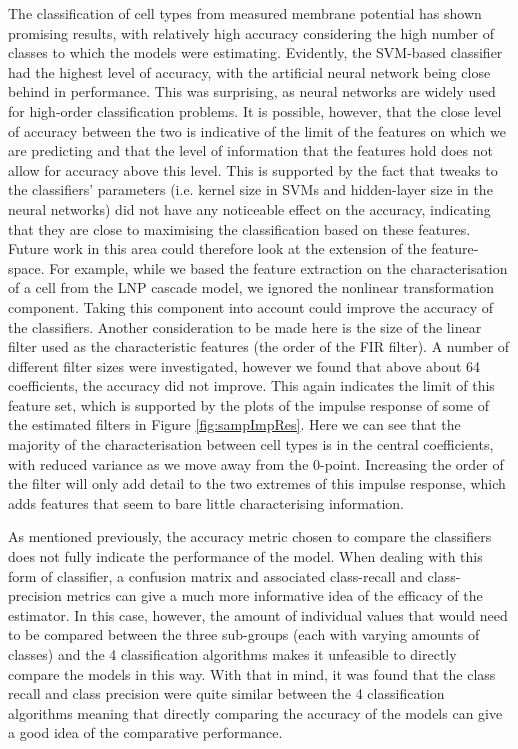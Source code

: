 The classification of cell types from measured membrane potential has shown promising results, with relatively high accuracy considering the high number of classes to which the models were estimating. Evidently, the SVM-based classifier had the highest level of accuracy, with the artificial neural network being close behind in performance. This was surprising, as neural networks are widely used for high-order classification problems. It is possible, however, that the close level of accuracy between the two is indicative of the limit of the features on which we are predicting and that the level of information that the features hold does not allow for accuracy above this level. This is supported by the fact that tweaks to the classifiers' parameters (i.e. kernel size in SVMs and hidden-layer size in the neural networks) did not have any noticeable effect on the accuracy, indicating that they are close to maximising the classification based on these features. Future work in this area could therefore look at the extension of the feature-space. For example, while we based the feature extraction on the characterisation of a cell from the LNP cascade model, we ignored the nonlinear transformation component. Taking this component into account could improve the accuracy of the classifiers. Another consideration to be made here is the size of the linear filter used as the characteristic features (the order of the FIR filter). A number of different filter sizes were investigated, however we found that above about 64 coefficients, the accuracy did not improve. This again indicates the limit of this feature set, which is supported by the plots of the impulse response of some of the estimated filters in Figure \ref{fig:sampImpRes}. Here we can see that the majority of the characterisation between cell types is in the central coefficients, with reduced variance as we move away from the 0-point. Increasing the order of the filter will only add detail to the two extremes of this impulse response, which adds features that seem to bare little characterising information.
\par
As mentioned previously, the accuracy metric chosen to compare the classifiers does not fully indicate the performance of the model. When dealing with this form of classifier, a confusion matrix and associated class-recall and class-precision metrics can give a much more informative idea of the efficacy of the estimator. In this case, however, the amount of individual values that would need to be compared between the three sub-groups (each with varying amounts of classes) and the 4 classification algorithms makes it unfeasible to directly compare the models in this way. With that in mind, it was found that the class recall and class precision were quite similar between the 4 classification algorithms meaning that directly comparing the accuracy of the models can give a good idea of the comparative performance.\\
